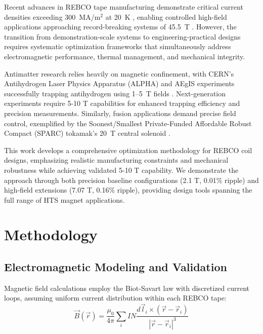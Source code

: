 \documentclass[10pt,twocolumn]{article}
\begin{document}
Recent advances in REBCO tape manufacturing demonstrate critical current densities exceeding 300~MA/m$^2$ at 20~K \cite{superpower2022}, enabling controlled high-field applications approaching record-breaking systems of 45.5~T \cite{hahn2019}. However, the transition from demonstration-scale systems to engineering-practical designs requires systematic optimization frameworks that simultaneously address electromagnetic performance, thermal management, and mechanical integrity.

Antimatter research relies heavily on magnetic confinement, with CERN's Antihydrogen Laser Physics Apparatus (ALPHA) and AEgIS experiments successfully trapping antihydrogen using 1--5~T fields \cite{alpha2023,aegis2018}. Next-generation experiments require 5-10 T capabilities for enhanced trapping efficiency and precision measurements. Similarly, fusion applications demand precise field control, exemplified by the Soonest/Smallest Private-Funded Affordable Robust Compact (SPARC) tokamak's 20~T central solenoid \cite{sparc2020}.

This work develops a comprehensive optimization methodology for REBCO coil designs, emphasizing realistic manufacturing constraints and mechanical robustness while achieving validated 5-10 T capability. We demonstrate the approach through both precision baseline configurations (2.1 T, 0.01\% ripple) and high-field extensions (7.07 T, 0.16\% ripple), providing design tools spanning the full range of HTS magnet applications.

\section{Methodology}

\subsection{Electromagnetic Modeling and Validation}

Magnetic field calculations employ the Biot-Savart law with discretized current loops, assuming uniform current distribution within each REBCO tape:
\begin{equation}
\vec{B}(\vec{r}) = \frac{\mu_0}{4\pi} \sum_{i} I N \frac{d\vec{l}_i \times (\vec{r} - \vec{r}_i)}{|\vec{r} - \vec{r}_i|^3}
\end{equation}
\end{document}
